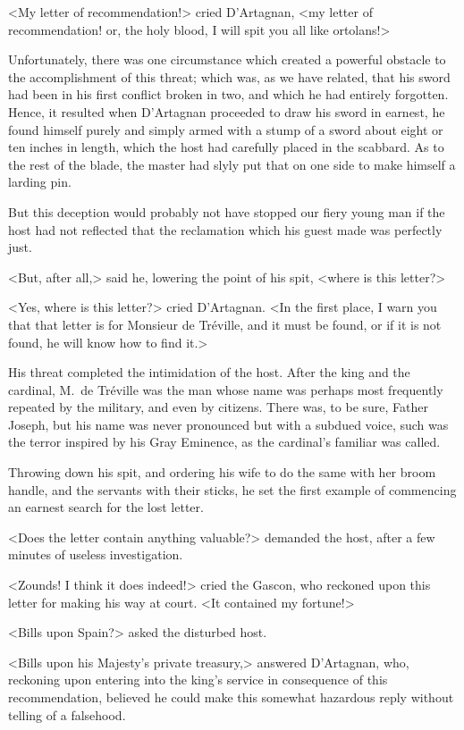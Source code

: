 <My letter of recommendation!> cried D'Artagnan, <my letter of recommendation! or, the holy blood, I will spit you all like ortolans!> 

Unfortunately, there was one circumstance which created a powerful obstacle to the accomplishment of this threat; which was, as we have related, that his sword had been in his first conflict broken in two, and which he had entirely forgotten. Hence, it resulted when D'Artagnan proceeded to draw his sword in earnest, he found himself purely and simply armed with a stump of a sword about eight or ten inches in length, which the host had carefully placed in the scabbard. As to the rest of the blade, the master had slyly put that on one side to make himself a larding pin. 

But this deception would probably not have stopped our fiery young man if the host had not reflected that the reclamation which his guest made was perfectly just. 

<But, after all,> said he, lowering the point of his spit, <where is this letter?> 

<Yes, where is this letter?> cried D'Artagnan. <In the first place, I warn you that that letter is for Monsieur de Tréville, and it must be found, or if it is not found, he will know how to find it.> 

His threat completed the intimidation of the host. After the king and the cardinal, M.~de Tréville was the man whose name was perhaps most frequently repeated by the military, and even by citizens. There was, to be sure, Father Joseph, but his name was never pronounced but with a subdued voice, such was the terror inspired by his Gray Eminence, as the cardinal's familiar was called. 

Throwing down his spit, and ordering his wife to do the same with her broom handle, and the servants with their sticks, he set the first example of commencing an earnest search for the lost letter. 

<Does the letter contain anything valuable?> demanded the host, after a few minutes of useless investigation. 

<Zounds! I think it does indeed!> cried the Gascon, who reckoned upon this letter for making his way at court. <It contained my fortune!> 

<Bills upon Spain?> asked the disturbed host. 

<Bills upon his Majesty's private treasury,> answered D'Artagnan, who, reckoning upon entering into the king's service in consequence of this recommendation, believed he could make this somewhat hazardous reply without telling of a falsehood. 

